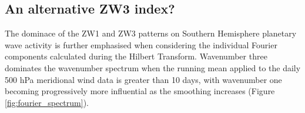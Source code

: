 \subsection{An alternative ZW3 index?}

The dominace of the ZW1 and ZW3 patterns on Southern Hemisphere planetary wave activity is further emphasised when considering the individual Fourier components calculated during the Hilbert Transform. Wavenumber three dominates the wavenumber spectrum when the running mean applied to the daily 500 hPa meridional wind data is greater than 10 days, with wavenumber one becoming progressively more influential as the smoothing increases (Figure \ref{fig:fourier_spectrum}).

